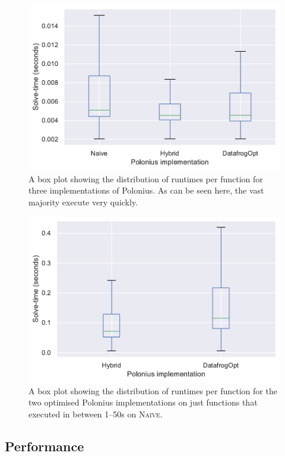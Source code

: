 \documentclass[11pt,a4paper,twoside,openany]{report}
\begin{document}
{\begin{figure}
  \includegraphics[width=0.9\linewidth]{Graphs/solvetimes_boxplot.pdf}
  \caption[Runtimes Per Function for Three Polonius Variants]{A box plot
    showing the distribution of runtimes per function for three
    implementations of Polonius. As can be seen here, the vast majority execute
    very quickly.}
  \label{fig:solvetimes}
\end{figure}


\begin{figure}
  \includegraphics[width=0.9\linewidth]{Graphs/solvetimes_boxplot_over_1s.pdf}
  \caption[Runtimes Per Function for Two Polonius Variants on Longer-Running
  Inputs]{A box plot showing the distribution of runtimes per function for the
    two optimised Polonius implementations on just functions that executed in
    between 1--50s on \textsc{Naive}.}
  \label{fig:solvetimes-long}
\end{figure}

\subsection{Performance}\label{sec:inputs:performance}

}
\end{document}

